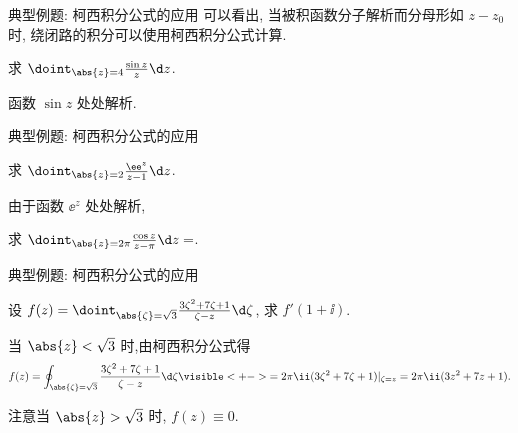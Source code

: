 \begin{frame}{典型例题: 柯西积分公式的应用}
	\onslide<+->
	可以看出, 当被积函数分子解析而分母形如 $z-z_0$ 时, 绕闭路的积分可以使用柯西积分公式计算.
	\onslide<+->
	\begin{example}[nearnext]
		求 $\doint_{\abs{z}=4}\frac{\sin z}z\d z$.
	\end{example}
	\onslide<+->
	\begin{solution}[nearprev]
		函数 $\sin z$ 处处解析.
		\bigdel
	\end{solution}
\end{frame}


\begin{frame}{典型例题: 柯西积分公式的应用}
	\onslide<+->
	\begin{example}[nearnext]
		求 $\doint_{\abs{z}=2}\frac{\ee^z}{z-1}\d z$.
	\end{example}
	\onslide<+->
	\begin{solution}[nearprev]
		由于函数 $\ee^z$ 处处解析,
		\bigdel
	\end{solution}
	\onslide<+->
	\begin{exercise}
		求 $\doint_{\abs{z}=2\pi}\frac{\cos z}{z-\pi}\d z=$\fillblankframe{$-2\pi\ii$}.
	\end{exercise}
\end{frame}


\begin{frame}{典型例题: 柯西积分公式的应用}
	\onslide<+->
	\begin{example}[nearnext]
		设 $f(z)=\doint_{\abs{\zeta}=\sqrt3}\frac{3\zeta^2+7\zeta+1}{\zeta-z}\d \zeta$, 求 $f'(1+\ii)$.
	\end{example}
	\onslide<+->
	\begin{solution}[nearprev]
		当 $\abs{z}<\sqrt3$ 时,由柯西积分公式得
		\[
			f(z)=\oint_{\abs{\zeta}=\sqrt3}\frac{3\zeta^2+7\zeta+1}{\zeta-z}\d \zeta
			\visible<+->{=2\pi\ii(3\zeta^2+7\zeta+1)|_{\zeta=z}=2\pi\ii(3z^2+7z+1).}
		\]
		\onslide<+->{
			\[
				f'(1+\ii)=2\pi\ii(13+6\ii)=-12\pi+26\pi\ii.
			\]
		}\bigdel
	\end{solution}
	\onslide<+->
	注意当 $\abs{z}>\sqrt3$ 时, $f(z)\equiv0$.
\end{frame}



